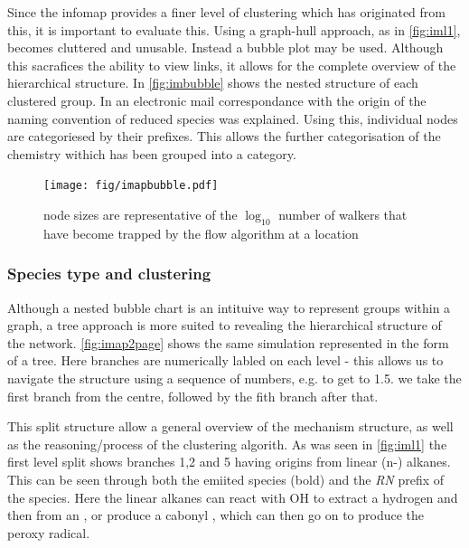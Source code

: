 Since the infomap provides a finer level of clustering which has originated from this, it is important to evaluate this. Using a graph-hull approach, as in \autoref{fig:iml1}, becomes cluttered and unusable. Instead a bubble plot may be used. Although this sacrafices the ability to view links, it allows for the complete overview of the hierarchical structure. In \autoref{fig:imbubble} shows the nested structure of each clustered group. In an electronic mail correspondance with \cite{correspondance} the origin of the naming convention of reduced species was explained. Using this, individual nodes are categoriesed by their prefixes. This allows the further categorisation of the chemistry withich has been grouped into a category. 

\begin{figure}[H]
  \centering
  \texttt{[image: fig/imapbubble.pdf]}
  \caption{\textbf{}node sizes are representative of the $\log_{10}$ number of walkers that have become trapped by the flow algorithm at a location}
    \label{fig:imbubble}
\end{figure}




\subsubsection{Species type and clustering}
Although a nested bubble chart is an intituive way to represent groups within a graph, a tree approach is more suited to revealing the hierarchical structure of the network. \autoref{fig:imap2page} shows the same simulation represented in the form of a tree. Here branches are numerically labled on each level - this allows us to navigate the structure using a sequence of numbers, e.g. to get to 1.5. we take the first branch from the centre, followed by the fith branch after that.

This split structure allow a general overview of the mechanism structure, as well as the reasoning/process of the clustering algorith. As was seen in \autoref{fig:iml1} the first level split shows branches 1,2 and 5 having origins from linear (n-) alkanes. This can be seen through both the emiited species (bold) and the \emph{RN} prefix of the species. Here the linear alkanes can react with OH to extract a hydrogen and then from an , or produce a cabonyl \emph{}, which can then go on to produce the \emph{} peroxy radical.

